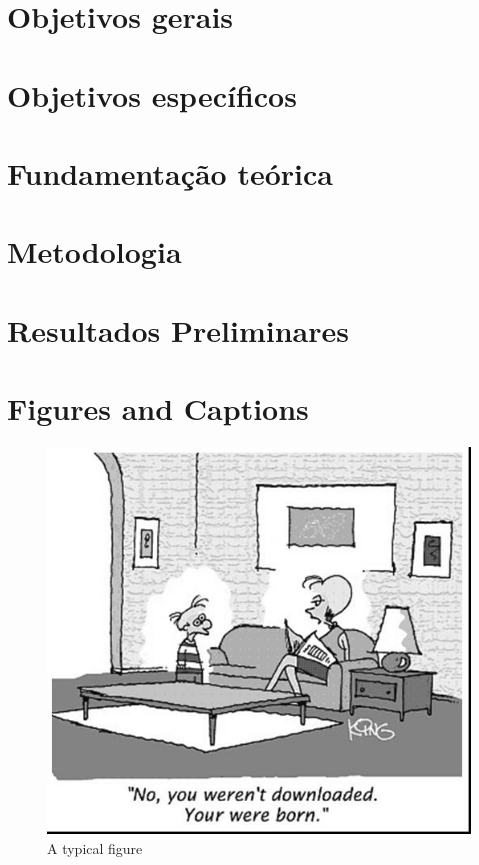 \documentclass[12pt]{article}
\begin{document}
\section{Objetivos gerais}



\section{Objetivos específicos}



\section{Fundamentação teórica}



\section{Metodologia}



\section{Resultados Preliminares}



\section{Figures and Captions}\label{sec:figs}




\begin{figure}[ht]
\centering
\includegraphics[width=.5\textwidth]{fig1.jpg}
\caption{A typical figure}
\label{fig:exampleFig1}
\end{figure}
\end{document}
